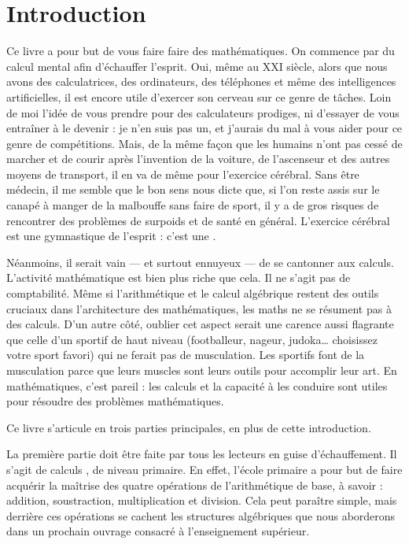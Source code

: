 \section{Introduction}


Ce livre a pour but de vous faire faire des mathématiques. On commence par du calcul mental afin d’échauffer l’esprit. Oui, même au XXI siècle, alors que nous avons des calculatrices, des ordinateurs, des téléphones et même des intelligences artificielles, il est encore utile d’exercer son cerveau sur ce genre de tâches. Loin de moi l’idée de vous prendre pour des calculateurs prodiges, ni d’essayer de vous entraîner à le devenir : je n’en suis pas un, et j’aurais du mal à vous aider pour ce genre de compétitions. Mais, de la même façon que les humains n’ont pas cessé de marcher et de courir après l’invention de la voiture, de l’ascenseur et des autres moyens de transport, il en va de même pour l’exercice cérébral. Sans être médecin, il me semble que le bon sens nous dicte que, si l’on reste assis sur le canapé à manger de la malbouffe sans faire de sport, il y a de gros risques de rencontrer des problèmes de surpoids et de santé en général. L’exercice cérébral est une gymnastique de l’esprit : c'est une .

Néanmoins, il serait vain — et surtout ennuyeux — de se cantonner aux calculs. L’activité mathématique est bien plus riche que cela. Il ne s’agit pas de comptabilité. Même si l’arithmétique et le calcul algébrique restent des outils cruciaux dans l’architecture des mathématiques, les maths ne se résument pas à des calculs. D’un autre côté, oublier cet aspect serait une carence aussi flagrante que celle d’un sportif de haut niveau (footballeur, nageur, judoka… choisissez votre sport favori) qui ne ferait pas de musculation. Les sportifs font de la musculation parce que leurs muscles sont leurs outils pour accomplir leur art. En mathématiques, c’est pareil : les calculs et la capacité à les conduire sont utiles pour résoudre des problèmes mathématiques.

Ce livre s’articule en trois parties principales, en plus de cette introduction.

La première partie doit être faite par tous les lecteurs en guise d’échauffement. Il s’agit de calculs , de niveau primaire. En effet, l’école primaire a pour but de faire acquérir la maîtrise des quatre opérations de l’arithmétique de base, à savoir : addition, soustraction, multiplication et division. Cela peut paraître simple, mais derrière ces  opérations se cachent les structures algébriques que nous aborderons dans un prochain ouvrage consacré à l’enseignement supérieur.

